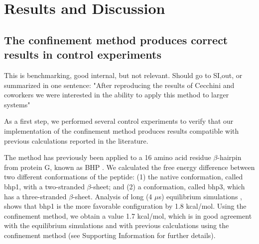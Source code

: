 \documentclass[12pt]{article}
\newcommand{\Alberto}[1]{\color{ForestGreen}#1\normalcolor }
\begin{document}
\section{Results and Discussion}

\subsection{The confinement method produces correct results in control experiments}

\Alberto{ This is benchmarking, good internal, but not relevant. Should go to SI,out, or summarized
    in one sentence:  "After reproducing the results of Cecchini and coworkers we were interested in
the ability to apply this method to larger systems"}

\Alberto{As a first step, we performed several control experiments to verify that our implementation of the
confinement method produces results compatible with previous calculations reported in the
literature.

The method has previously been applied to a 16 amino acid residue $\beta$-hairpin from
protein G, known as BHP \cite{Cecchini2009}. We calculated the free energy difference between two different
conformations of the peptide: (1) the native conformation, called bhp1, with a two-stranded
$\beta$-sheet; and (2) a conformation, called bhp3, which has a three-stranded $\beta$-sheet.
Analysis of long (4 $\mu$s) equilibrium simulations \cite{Cecchini2009},\cite{Krivov2004}  shows that bhp1 is the more favorable
configuration by 1.8 kcal/mol. Using the confinement method, we obtain a value 1.7 kcal/mol, which
is in good agreement with the equilibrium simulations and with previous calculations using the
confinement method \cite{Cecchini2009} (see Supporting Information for further details).}
\end{document}
